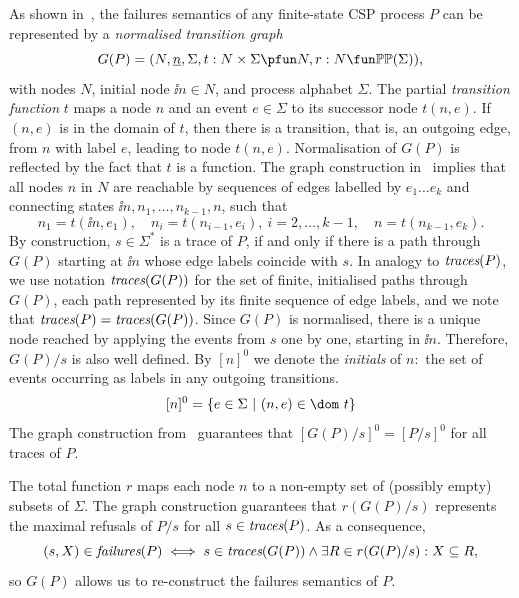 As shown in~\cite{Roscoe:1994:CME:197600}, the failures semantics of 
any finite-state CSP process $P$
can be represented by a \emph{normalised transition graph}
$$
G(P) = ( N, \ii n, \Sigma, t : N\times\Sigma \pfun N, r : N \fun \mathbb{P}\mathbb{P}(\Sigma)),
$$
with nodes $N$, initial node $\ii n\in N$, and process alphabet $\Sigma$. The
partial \emph{transition function} $t$ maps a node $n$ and an event
$e\in\Sigma$ to its successor node $t(n,e)$. If $(n,e)$ is in the domain of
$t$, then there is a transition, that is, an outgoing edge, from $n$ with label $e$, leading to node $t(n,e)$. Normalisation of
$G(P)$ is reflected by the fact that $t$ is a function. The graph construction
in~\cite{Roscoe:1994:CME:197600} implies that all nodes $n$ in $N$ are reachable by
sequences of edges labelled by $e_1\dots e_k$ and connecting states
$\ii n,n_1,\dots,n_{k-1},n$, such that
\[
n_1 = t(\ii n,e_1), \quad n_i = t(n_{i-1},e_i),\ i = 2,\dots,k-1,\quad
n= t(n_{k-1},e_k).
\]
%
By construction, $s\in\Sigma^*$ is a trace of $P$, if and only if 
there is a path through $G(P)$ starting  at $\ii n$ whose edge labels
coincide with $s$. In analogy to $\text{\it traces}(P)$, we use
notation $\text{\it traces}(G(P))$ for the set of finite, initialised paths
through $G(P)$, each path represented by its finite sequence of edge labels, and we
note that $\text{\it traces}(P) = \text{\it traces}(G(P))$. 
Since $G(P)$ is normalised, there is a unique node
reached by applying the events from $s$ one by one, starting in $\ii n$.
Therefore, $G(P)/s$  is also well defined. By $[n]^0$ we denote the
\emph{initials} of $n$:~the set of events occurring as labels in any outgoing
transitions.
$$
[n]^0 = \{ e\in\Sigma~|~(n,e)\in\dom~t \}
$$
The graph construction from~\cite{Roscoe:1994:CME:197600} guarantees that
$[G(P)/s]^0 = [P/s]^0$ for all traces of $P$.

 

The total function $r$ maps each node $n$ to a non-empty set of  (possibly empty) subsets of $\Sigma$. 
The graph construction guarantees that $r(G(P)/s)$ represents the maximal refusals
of $P/s$ for all 
$s\in\text{\it traces}(P)$. As a consequence,  
\begin{equation}\label{eq:refsAndR}
(s,X)\in\text{\it failures}(P) \iff s\in\text{\it traces}(G(P)) \wedge \exists R\in r(G(P)/s): X\subseteq R,
\end{equation}
so $G(P)$ allows us to re-construct the failures semantics of $P$.


 

%
%

